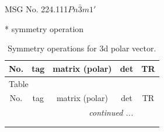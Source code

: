 \documentclass[fleqn,8pt]{jsarticle}
\begin{document}
\setcounter{MaxMatrixCols}{32}

\renewcommand{\tablename}{Table~}
\renewcommand{\figurename}{Figure~}
\begin{center}
\LARGE
MSG No. 224.111\quad$Pn\bar{3}m1'$
\end{center}
* symmetry operation
\renewcommand{\arraystretch}{1.3}
\begin{longtable}{ccccc}
\caption{Symmetry operations for 3d polar vector.}
 \\
 \hline \hline
No. & tag & matrix (polar) & det & TR \\ \hline \endfirsthead

\multicolumn{4}{l}{\tablename\ \thetable{}} \\
 \hline \hline
No. & tag & matrix (polar) & det & TR \\ \hline \endhead

 \hline \hline
\multicolumn{4}{r}{\footnotesize\it continued ...} \\ \endfoot

 \hline \hline
\multicolumn{4}{r}{} \\ \endlastfoot


\end{longtable}
\end{document}
